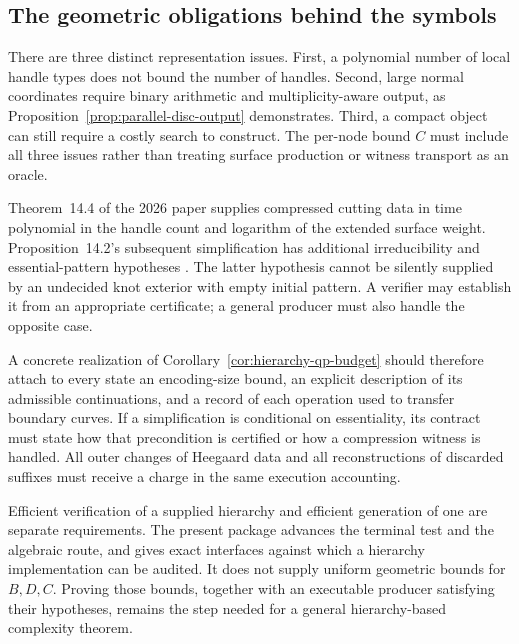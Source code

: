 \subsection{The geometric obligations behind the symbols}

There are three distinct representation issues.  First, a polynomial
number of local handle types does not bound the number of handles.
Second, large normal coordinates require binary arithmetic and
multiplicity-aware output, as
Proposition~\ref{prop:parallel-disc-output} demonstrates.  Third, a
compact object can still require a costly search to construct.
The per-node bound $C$ must include all three issues rather than treating
surface production or witness transport as an oracle.

Theorem~14.4 of the 2026 paper supplies compressed cutting data in time
polynomial in the handle count and logarithm of the extended surface
weight.  Proposition~14.2's subsequent simplification has additional
irreducibility and essential-pattern hypotheses
\cite[Prop.~14.2 and Thm.~14.4]{lackenby2026}.
The latter hypothesis cannot be silently supplied by an undecided knot
exterior with empty initial pattern.  A verifier may establish it from
an appropriate certificate; a general producer must also handle the
opposite case.

A concrete realization of Corollary~\ref{cor:hierarchy-qp-budget} should
therefore attach to every state an encoding-size bound, an explicit
description of its admissible continuations, and a record of each
operation used to transfer boundary curves.  If a simplification is
conditional on essentiality, its contract must state how that
precondition is certified or how a compression witness is handled.
All outer changes of Heegaard data and all reconstructions of discarded
suffixes must receive a charge in the same execution accounting.

Efficient verification of a supplied hierarchy and efficient generation
of one are separate requirements.  The present package advances the
terminal test and the algebraic route, and gives exact interfaces against
which a hierarchy implementation can be audited.  It does not supply
uniform geometric bounds for $B,D,C$.  Proving those bounds, together
with an executable producer satisfying their hypotheses, remains the
step needed for a general hierarchy-based complexity theorem.

